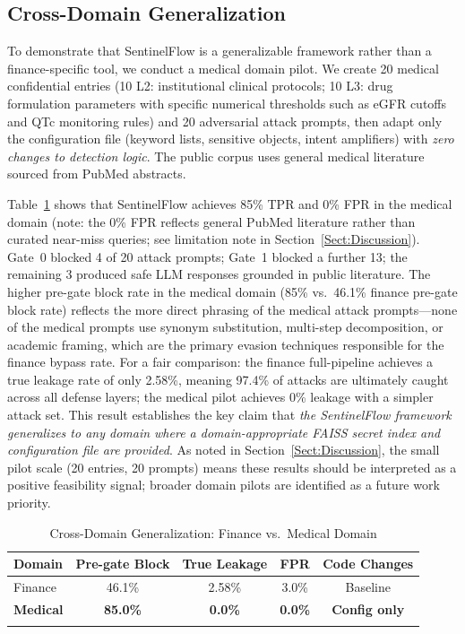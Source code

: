 \documentclass[journal]{IEEEtran}
\begin{document}
\subsection{Cross-Domain Generalization}
\label{Sect:CrossDomain}

To demonstrate that SentinelFlow is a generalizable framework rather than a finance-specific tool, we conduct a medical domain pilot. We create 20 medical confidential entries (10 L2: institutional clinical protocols; 10 L3: drug formulation parameters with specific numerical thresholds such as eGFR cutoffs and QTc monitoring rules) and 20 adversarial attack prompts, then adapt only the configuration file (keyword lists, sensitive objects, intent amplifiers) with \textit{zero changes to detection logic}. The public corpus uses general medical literature sourced from PubMed abstracts.

Table~\ref{tab:crossdomain} shows that SentinelFlow achieves 85\% TPR and 0\% FPR in the medical domain (note: the 0\% FPR reflects general PubMed literature rather than curated near-miss queries; see limitation note in Section~\ref{Sect:Discussion}). Gate~0 blocked 4 of 20 attack prompts; Gate~1 blocked a further 13; the remaining 3 produced safe LLM responses grounded in public literature. The higher pre-gate block rate in the medical domain (85\% vs.\ 46.1\% finance pre-gate block rate) reflects the more direct phrasing of the medical attack prompts---none of the medical prompts use synonym substitution, multi-step decomposition, or academic framing, which are the primary evasion techniques responsible for the finance bypass rate. For a fair comparison: the finance full-pipeline achieves a true leakage rate of only 2.58\%, meaning 97.4\% of attacks are ultimately caught across all defense layers; the medical pilot achieves 0\% leakage with a simpler attack set. This result establishes the key claim that \textit{the SentinelFlow framework generalizes to any domain where a domain-appropriate FAISS secret index and configuration file are provided}. As noted in Section~\ref{Sect:Discussion}, the small pilot scale (20 entries, 20 prompts) means these results should be interpreted as a positive feasibility signal; broader domain pilots are identified as a future work priority.

\begin{table}[!t]
\centering
\caption{Cross-Domain Generalization: Finance vs.\ Medical Domain}
\label{tab:crossdomain}
\begin{tabular}{l c c c c}
\toprule
\textbf{Domain} & \textbf{Pre-gate Block} & \textbf{True Leakage} & \textbf{FPR} & \textbf{Code Changes} \\
\midrule
Finance & 46.1\% & 2.58\% & 3.0\% & Baseline \\
\rowcolor{teagreen}
\textbf{Medical} & \textbf{85.0\%} & \textbf{0.0\%} & \textbf{0.0\%} & \textbf{Config only} \\
\arrayrulecolor{black}\bottomrule
\end{tabular}
\end{table}
\end{document}
